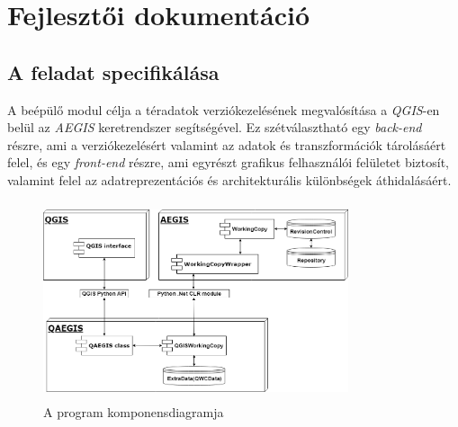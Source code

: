 \chapter{Fejlesztői dokumentáció}
\label{ch:impl}

\section{A feladat specifikálása}
A beépülő modul célja a téradatok verziókezelésének megvalósítása a \emph{QGIS}-en belül az \emph{AEGIS} keretrendszer segítségével. Ez szétválasztható egy \emph{back-end} részre, ami a verziókezelésért valamint az adatok és transzformációk tárolásáért felel, és egy \emph{front-end} részre, ami egyrészt grafikus felhasználói felületet biztosít, valamint felel az adatreprezentációs és architekturális különbségek áthidalásáért.

\begin{figure}[H]
	\centering
	\includegraphics[width=0.8\textwidth,height=220px]{images/qaegis_component_diagram.png}
	\caption{A program komponensdiagramja}
	\label{fig:picture-7}
\end{figure}

